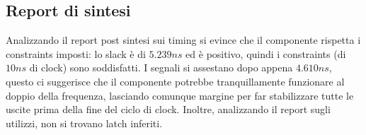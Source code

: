 \documentclass[11pt]{article} %
\begin{document}
\subsection{Report di sintesi}
Analizzando il report post sintesi sui timing si evince che il componente rispetta i constraints imposti: lo slack è di $5.239ns$ ed è positivo, quindi i constraints (di $10ns$ di clock) sono soddisfatti. I segnali si assestano dopo appena $4.610ns$, questo ci suggerisce che il componente potrebbe tranquillamente funzionare al doppio della frequenza, lasciando comunque margine per far stabilizzare tutte le uscite prima della fine del ciclo di clock. Inoltre, analizzando il report sugli utilizzi, non si trovano latch inferiti.

\end{document}
